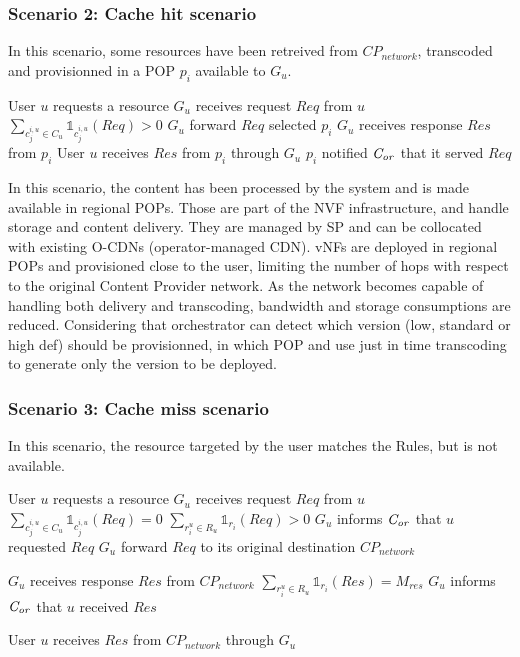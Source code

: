\subsubsection*{Scenario 2: Cache hit scenario}

In this scenario, some resources have been retreived from \(\mathit{CP}_{\mathit{network}}\), transcoded and provisionned in a POP $p_{i}$ available to $G_{u}$.

\begin{algorithmic}[1]
	\STATE User $u$ requests a resource
\STATE $G_{u}$ receives request $\mathit{Req}$ from $u$
\STATE \( \sum_{c^{i,u}_{j}\in C_{u}}{\mathbb{1}_{c^{i,u}_{j}}(\mathit{Req})}>0\)
\STATE $G_{u}$ forward $\mathit{Req}$ selected $p_{i}$
\STATE $G_{u}$ receives response $\mathit{Res}$ from $p_{i}$
\STATE User $u$ receives $\mathit{Res}$ from $p_{i}$ through $G_{u}$
\STATE $p_{i}$ notified $\mathit{C_{or}}$ that it served  $\mathit{Req}$
\end{algorithmic}


In this scenario, the content has been processed by the system and is made available in regional POPs.
Those are part of the NVF infrastructure, and handle storage and content delivery.
They are managed by SP and can be collocated with existing O-CDNs (operator-managed CDN).
vNFs are deployed in regional POPs and provisioned close to the user, limiting the number of hops with respect to the original Content Provider network.
As the network becomes capable of handling both delivery and transcoding, bandwidth and storage consumptions are reduced. Considering that orchestrator can detect which version (low, standard or high def) should be provisionned, in which POP and use just in time transcoding to generate only the version to be deployed.

\subsubsection*{Scenario 3: Cache miss scenario}

In this scenario, the resource targeted by the user matches the Rules, but is not available.

\begin{algorithmic}[1]
\STATE User $u$ requests a resource
\STATE $G_{u}$ receives request $\mathit{Req}$ from $u$
\STATE \( \sum_{c^{i,u}_{j}\in C_{u}}{\mathbb{1}_{c^{i,u}_{j}}(\mathit{Req})} = 0 \)
\STATE \( \sum_{r^{u}_{i}\in R_{u}}{\mathbb{1}_{r_{i}}(\mathit{Req})} > 0  \)
\STATE $G_{u}$ informs $\mathit{C_{or}}$ that $u$ requested $\mathit{Req}$
\ENDIF
\STATE $G_{u}$ forward $\mathit{Req}$ to its original destination \(\mathit{CP}_{\mathit{network}}\)

\STATE $G_{u}$ receives response $\mathit{Res}$ from \(\mathit{CP}_{\mathit{network}}\)
	\STATE \( \sum_{r^{u}_{i}\in R_{u}}{\mathbb{1}_{r_{i}}(\mathit{Res})}=M_{res}\) 
	\STATE $G_{u}$ informs $\mathit{C_{or}}$ that $u$ received $\mathit{Res}$
	\ENDIF
\ENDIF

 
\STATE User $u$ receives $\mathit{Res}$ from \(\mathit{CP}_{\mathit{network}}\) through $G_{u}$
\end{algorithmic}


